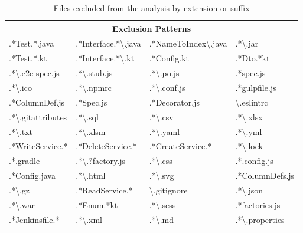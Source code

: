 \begin{table}[h!]
\centering
\caption{Files excluded from the analysis by extension or suffix}
\label{tbl:file-extensions-excluded-from-analysis}
\begin{tabular}{@{}llll@{}}
\toprule
\multicolumn{4}{c}{Exclusion Patterns} \\ \midrule
.*Test.*.java & .*Interface.*\textbackslash{}.java & .*NameToIndex\textbackslash{}.java & .*\textbackslash{}.jar \\
.*Test.*.kt & .*Interface.*\textbackslash{}.kt & .*Config.kt & .*Dto.*kt \\
.*\textbackslash{}.e2e-spec.js & .*\textbackslash{}.stub.js & .*\textbackslash{}.po.js & .*spec.js \\
.*\textbackslash{}.ico & .*\textbackslash{}.npmrc & .*\textbackslash{}.conf.js & .*gulpfile.js \\
.*ColumnDef.js & .*Spec.js & .*Decorator.js & \textbackslash{}.eslintrc \\
.*\textbackslash{}.gitattributes & .*\textbackslash{}.sql & .*\textbackslash{}.csv & .*\textbackslash{}.xlsx \\
.*\textbackslash{}.txt & .*\textbackslash{}.xlsm & .*\textbackslash{}.yaml & .*\textbackslash{}.yml \\
.*WriteService.* & .*DeleteService.* & .*CreateService.* & .*\textbackslash{}.lock \\
.*.gradle & .*\textbackslash{}.?factory.js & .*\textbackslash{}.css & .*.config.js \\
.*Config.java & .*\textbackslash{}.html & .*\textbackslash{}.svg & .*ColumnDefs.js \\
.*\textbackslash{}.gz & .*ReadService.* & \textbackslash{}.gitignore & .*\textbackslash{}.json \\
.*\textbackslash{}.war & .*Enum.*kt & .*\textbackslash{}.scss & .*factories.js \\
.*Jenkinsfile.* & .*\textbackslash{}.xml & .*\textbackslash{}.md & .*\textbackslash{}.properties \\ \bottomrule
\end{tabular}
\end{table}




